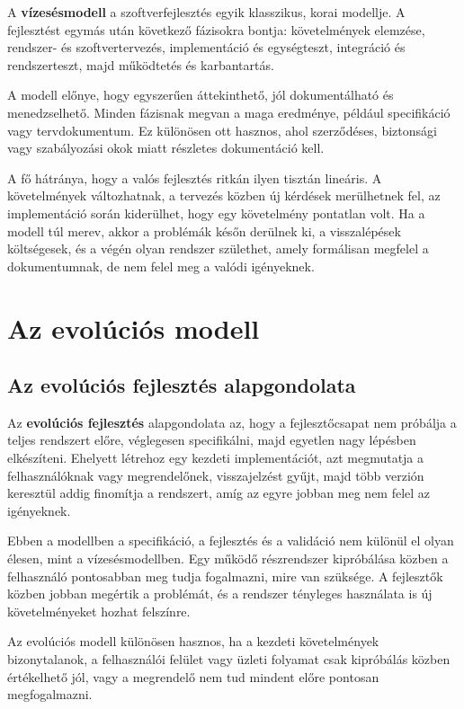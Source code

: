 A \textbf{vízesésmodell} a szoftverfejlesztés egyik klasszikus, korai modellje. A fejlesztést egymás után következő fázisokra bontja: követelmények elemzése, rendszer- és szoftvertervezés, implementáció és egységteszt, integráció és rendszerteszt, majd működtetés és karbantartás.

A modell előnye, hogy egyszerűen áttekinthető, jól dokumentálható és menedzselhető. Minden fázisnak megvan a maga eredménye, például specifikáció vagy tervdokumentum. Ez különösen ott hasznos, ahol szerződéses, biztonsági vagy szabályozási okok miatt részletes dokumentáció kell.

A fő hátránya, hogy a valós fejlesztés ritkán ilyen tisztán lineáris. A követelmények változhatnak, a tervezés közben új kérdések merülhetnek fel, az implementáció során kiderülhet, hogy egy követelmény pontatlan volt. Ha a modell túl merev, akkor a problémák későn derülnek ki, a visszalépések költségesek, és a végén olyan rendszer születhet, amely formálisan megfelel a dokumentumnak, de nem felel meg a valódi igényeknek.

\section{Az evolúciós modell}

\subsection{Az evolúciós fejlesztés alapgondolata}

Az \textbf{evolúciós fejlesztés} alapgondolata az, hogy a fejlesztőcsapat nem próbálja a teljes rendszert előre, véglegesen specifikálni, majd egyetlen nagy lépésben elkészíteni. Ehelyett létrehoz egy kezdeti implementációt, azt megmutatja a felhasználóknak vagy megrendelőnek, visszajelzést gyűjt, majd több verzión keresztül addig finomítja a rendszert, amíg az egyre jobban meg nem felel az igényeknek.



Ebben a modellben a specifikáció, a fejlesztés és a validáció nem különül el olyan élesen, mint a vízesésmodellben. Egy működő részrendszer kipróbálása közben a felhasználó pontosabban meg tudja fogalmazni, mire van szüksége. A fejlesztők közben jobban megértik a problémát, és a rendszer tényleges használata is új követelményeket hozhat felszínre.

Az evolúciós modell különösen hasznos, ha a kezdeti követelmények bizonytalanok, a felhasználói felület vagy üzleti folyamat csak kipróbálás közben értékelhető jól, vagy a megrendelő nem tud mindent előre pontosan megfogalmazni.

